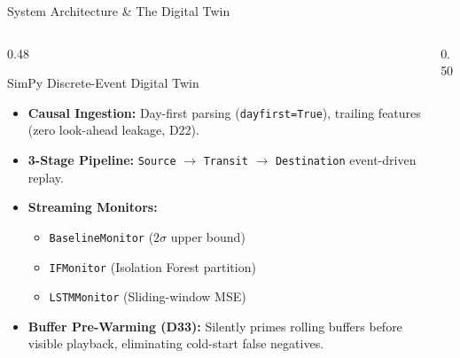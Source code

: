 \documentclass[aspectratio=169, 10pt]{beamer}
\begin{document}
\begin{frame}{System Architecture \& The Digital Twin}
    \begin{columns}[T]
        \begin{column}{0.48\textwidth}
            \begin{block}{SimPy Discrete-Event Digital Twin}
                \begin{itemize}\small
                    \item \textbf{Causal Ingestion:} Day-first parsing (\texttt{dayfirst=True}), trailing features (zero look-ahead leakage, D22).
                    \item \textbf{3-Stage Pipeline:} \texttt{Source} $\rightarrow$ \texttt{Transit} $\rightarrow$ \texttt{Destination} event-driven replay.
                    \item \textbf{Streaming Monitors:}
                    \begin{itemize}\footnotesize
                        \item \texttt{BaselineMonitor} ($2\sigma$ upper bound)
                        \item \texttt{IFMonitor} (Isolation Forest partition)
                        \item \texttt{LSTMMonitor} (Sliding-window MSE)
                    \end{itemize}
                    \item \textbf{Buffer Pre-Warming (D33):} Silently primes rolling buffers before visible playback, eliminating cold-start false negatives.
                \end{itemize}
            \end{block}
        \end{column}
        
        \begin{column}{0.50\textwidth}
            \centering
\end{column}
\end{columns}
\end{frame}
\end{document}

